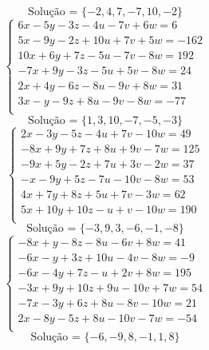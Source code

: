 \documentclass[12pt,oneside,a4paper]{article}
\begin{document}
\begin{equation*}
\text{Solução = }\{-2,4,7,-7,10,-2\}
\end{equation*}
\vspace{\baselineskip}
\begin{equation*}
\begin{cases}
6x-5y-3z-4u-7v+6w=6 \\
5x-9y-2z+10u+7v+5w=-162 \\
10x+6y+7z-5u-7v-8w=192 \\
-7x+9y-3z-5u+5v-8w=24 \\
2x+4y-6z-8u-9v+8w=31 \\
3x-y-9z+8u-9v-8w=-77 \\
\end{cases}
\end{equation*}
\begin{equation*}
\text{Solução = }\{1,3,10,-7,-5,-3\}
\end{equation*}
\vspace{\baselineskip}
\begin{equation*}
\begin{cases}
2x-3y-5z-4u+7v-10w=49 \\
-8x+9y+7z+8u+9v-7w=125 \\
-9x+5y-2z+7u+3v-2w=37 \\
-x-9y+5z-7u-10v-8w=53 \\
4x+7y+8z+5u+7v-3w=62 \\
5x+10y+10z-u+v-10w=190 \\
\end{cases}
\end{equation*}
\begin{equation*}
\text{Solução = }\{-3,9,3,-6,-1,-8\}
\end{equation*}
\vspace{\baselineskip}
\begin{equation*}
\begin{cases}
-8x+y-8z-8u-6v+8w=41 \\
-6x-y+3z+10u-4v-8w=-9 \\
-6x-4y+7z-u+2v+8w=195 \\
-3x+9y+10z+9u-10v+7w=54 \\
-7x-3y+6z+8u-8v-10w=21 \\
2x-8y-5z+8u-10v-7w=-54 \\
\end{cases}
\end{equation*}
\begin{equation*}
\text{Solução = }\{-6,-9,8,-1,1,8\}
\end{equation*}
\end{document}
